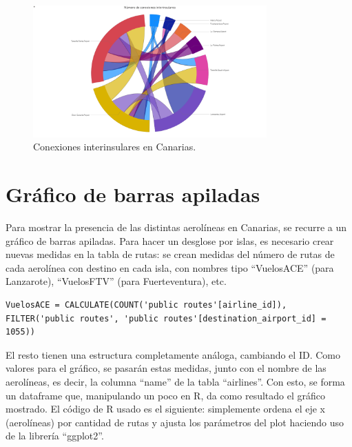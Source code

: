 \documentclass[11pt]{opticajnl}
\begin{document}
\begin{figure}[h]
\centering
\includegraphics[width=0.8\textwidth]{fotos/cuerda.png}
\caption{Conexiones interinsulares en Canarias.}
\label{fig:cuerdas}
\end{figure}


\section{Gráfico de barras apiladas}

Para mostrar la presencia de las distintas aerolíneas en Canarias, se recurre a un gráfico de barras apiladas. Para hacer un desglose por islas, es necesario crear nuevas medidas en la tabla de rutas: se crean medidas del número de rutas de cada aerolínea con destino en cada isla, con nombres tipo ``VuelosACE'' (para Lanzarote), ``VuelosFTV'' (para Fuerteventura), etc. 
\begin{lstlisting}[style=terminal]
VuelosACE = CALCULATE(COUNT('public routes'[airline_id]), FILTER('public routes', 'public routes'[destination_airport_id] = 1055))
\end{lstlisting}

El resto tienen una estructura completamente análoga, cambiando el ID. Como valores para el gráfico, se pasarán estas medidas, junto con el nombre de las aerolíneas, es decir, la columna ``name'' de la tabla ``airlines''. Con esto, se forma un dataframe que, manipulando un poco en R, da como resultado el gráfico mostrado. El código de R usado es el siguiente: simplemente ordena el eje x (aerolíneas) por cantidad de rutas y ajusta los parámetros del plot haciendo uso de la librería ``ggplot2''. 
\end{document}
